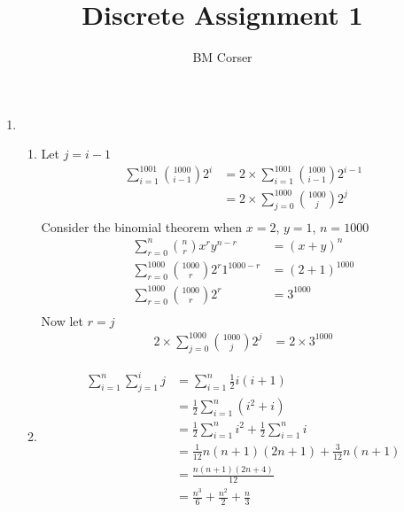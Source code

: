 \documentclass[10pt]{article}
\author{BM Corser}
\title{Discrete Assignment 1}
\begin{document}
    \maketitle 
    \begin{enumerate}
        \item
        \begin{enumerate}
            \item Let $j = i - 1$
                \begin{align*}
                    \sum_{i=1}^{1001} \binom{1000}{i-1}2^i &= 2 \times \sum_{i=1}^{1001} \binom{1000}{i-1}2^{i-1}\\
                    &= 2 \times \sum_{j=0}^{1000} \binom{1000}{j}2^{j}\\
                \end{align*}
                Consider the binomial theorem when $x = 2$, $y = 1$, $n = 1000$
            \begin{align*}
                \sum_{r=0}^{n}\binom{n}{r}x^ry^{n-r} &= (x+y)^n\\
                \sum_{r=0}^{1000}\binom{1000}{r}2^r1^{1000-r} &= (2+1)^{1000}\\
                \sum_{r=0}^{1000}\binom{1000}{r}2^r &= 3^{1000}\\
            \end{align*}
                Now let $r = j$
            \begin{align*}
                2 \times \sum_{j=0}^{1000} \binom{1000}{j}2^{j} &= 2 \times 3^{1000}
            \end{align*}
            \item
                \begin{align*}
                    \sum_{i=1}^n \sum_{j=1}^i j &= \sum_{i=1}^n \frac{1}{2}i(i + 1) \\
                                                &= \frac{1}{2} \sum_{i=1}^n (i^2 + i) \\
                                                &= \frac{1}{2} \sum_{i=1}^n i^2 + \frac{1}{2} \sum_{i=1}^n i \\
                                                &= \frac{1}{12}n(n + 1)(2n +1)  + \frac{3}{12}n(n + 1) \\
                                                &= \frac{n(n + 1)(2n + 4)}{12} \\
                                                &= \frac{n^3}{6} + \frac{n^2}{2} + \frac{n}{3}
                \end{align*}

\end{enumerate}
\end{enumerate}
\end{document}
